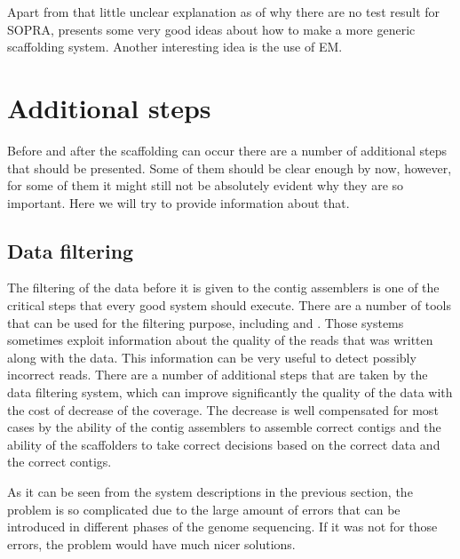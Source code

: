 \documentclass[11pt]{article}
\begin{document}
Apart from that little unclear explanation as of why there are no test result
for SOPRA, \cite{grass} presents some very good ideas about how to make a more
generic scaffolding system. Another interesting idea is the use of EM.



\section{Additional steps} %
\label{sec:Additional steps}
Before and after the scaffolding can occur there are a number of additional
steps that should be presented. Some of them should be clear enough by now,
however, for some of them it might still not be absolutely evident why they are
so important. Here we will try to provide information about that.

\subsection{Data filtering} %
\label{sub:Data filtering}
The filtering of the data before it is given to the contig assemblers is one of
the critical steps that every good system should execute. There are a number of
tools that can be used for the filtering purpose, including \cite{quake} and
\cite{filtering-solid}. Those systems sometimes exploit information about the
quality of the reads that was written along with the data. This information can
be very useful to detect possibly incorrect reads. There are a number of
additional steps that are taken by the data filtering system, which can improve
significantly the quality of the data with the cost of decrease of the coverage.
The decrease is well compensated for most cases by the ability of the contig
assemblers to assemble correct contigs and the ability of the scaffolders to
take correct decisions based on the correct data and the correct contigs.

As it can be seen from the system descriptions in the previous section, the
problem is so complicated due to the large amount of errors that can be
introduced in different phases of the genome sequencing. If it was not for those
errors, the problem would have much nicer solutions.
\end{document}
